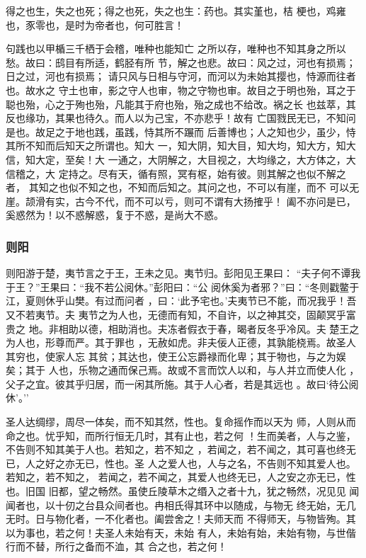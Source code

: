 \documentclass[]{article}
\begin{document}
得之也生，失之也死；得之也死，失之也生：药也。其实堇也，桔
梗也，鸡雍也，豕零也，是时为帝者也，何可胜言！

句践也以甲楯三千栖于会稽，唯种也能知亡
之所以存，唯种也不知其身之所以愁。故曰：鸱目有所适，鹤胫有所
节，解之也悲。故曰：风之过，河也有损焉；日之过，河也有损焉；
请只风与日相与守河，而河以为未始其撄也，恃源而往者也。故水之
守土也审，影之守人也审，物之守物也审。故目之于明也殆，耳之于
聪也殆，心之于殉也殆，凡能其于府也殆，殆之成也不给改。祸之长
也兹萃，其反也缘功，其果也待久。而人以为己宝，不亦悲乎！故有
亡国戮民无已，不知问是也。故足之于地也践，虽践，恃其所不蹍而
后善博也；人之知也少，虽少，恃其所不知而后知天之所谓也。知大
一，知大阴，知大目，知大均，知大方，知大信，知大定，至矣！大
一通之，大阴解之，大目视之，大均缘之，大方体之，大信稽之，大
定持之。尽有天，循有照，冥有枢，始有彼。则其解之也似不解之者，
其知之也似不知之也，不知而后知之。其问之也，不可以有崖，而不
可以无崖。颉滑有实，古今不代，而不可以亏，则可不谓有大扬搉乎！
阖不亦问是已，奚惑然为！以不惑解惑，复于不惑，是尚大不惑。

\hypertarget{header-n912}{%
\subsubsection{则阳}\label{header-n912}}

则阳游于楚，夷节言之于王，王未之见。夷节归。彭阳见王果曰：
``夫子何不谭我于王？''王果曰：``我不若公阅休。''彭阳曰：``公
阅休奚为者邪？''曰：``冬则戳鳖于江，夏则休乎山樊。有过而问者
，曰：`此予宅也。'夫夷节已不能，而况我乎！吾又不若夷节。夫
夷节之为人也，无德而有知，不自许，以之神其交，固颠冥乎富贵之
地。非相助以德，相助消也。夫冻者假衣于春，暍者反冬乎冷风。夫
楚王之为人也，形尊而严。其于罪也
，无赦如虎。非夫佞人正德，其孰能桡焉。故圣人其穷也，使家人忘
其贫；其达也，使王公忘爵禄而化卑；其于物也，与之为娱矣；其于
人也，乐物之通而保己焉。故或不言而饮人以和，与人并立而使人化
，父子之宜。彼其乎归居，而一闲其所施。其于人心者，若是其远也
。故曰`待公阅休'。''

圣人达绸缪，周尽一体矣，而不知其然，性也。复命摇作而以天为
师，人则从而命之也。忧乎知，而所行恒无几时，其有止也，若之何
！生而美者，人与之鉴，不告则不知其美于人也。若知之，若不知之
，若闻之，若不闻之，其可喜也终无已，人之好之亦无已，性也。圣
人之爱人也，人与之名，不告则不知其爱人也。若知之，若不知之，
若闻之，若不闻之，其爱人也终无已，人之安之亦无已，性也。旧国
旧都，望之畅然。虽使丘陵草木之缗入之者十九，犹之畅然，况见见
闻闻者也，以十仞之台县众间者也。冉相氏得其环中以随成，与物无
终无始，无几无时。日与物化者，一不化者也。阖尝舍之！夫师天而
不得师天，与物皆殉。其以为事也，若之何！夫圣人未始有天，未始
有人，未始有始，未始有物，与世偕行而不替，所行之备而不洫，其
合之也，若之何！
\end{document}
